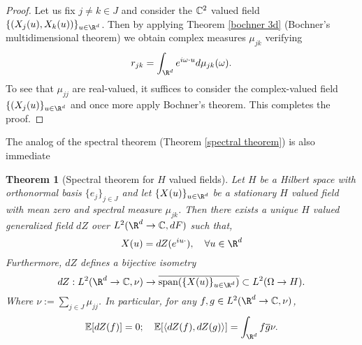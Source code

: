 \documentclass[12pt]{article}
\newtheorem{theorem}{Theorem}
\newcommand{\br}[1]{\left\langle#1\right\rangle}
\begin{document}
\begin{proof}
    Let us fix $j\neq k\in J$ and consider the $\mathbb{C}^2$ valued field $\{(X_j(u),X_k(u))\}_{u\in\R^d}$. Then by applying Theorem \ref{bochner 3d} (Bochner's multidimensional theorem) we obtain complex measures $\mu_{jk}$ verifying
    \begin{equation*}
        r_{jk}=\int_{\R^d} e^{i\omega \cdot u} d\mu _{j k}(\omega).
    \end{equation*}
    To  see that $\mu_{jj}$ are real-valued, it suffices to consider the complex-valued field $\{(X_j(u)\}_{u\in\R^d}$ and once more apply Bochner's theorem. This completes the proof.
\end{proof}
The analog of the spectral theorem (Theorem \ref{spectral theorem}) is also immediate
\begin{theorem}[Spectral theorem for $H$ valued fields]\label{spectral theorem hilbert}
    Let $H$ be a Hilbert space with orthonormal basis $\{e_j\}_{j\in J}$ and let $\{X(u)\}_{u\in\R^d}$ be a stationary $H$ valued field with mean zero and spectral measure $\mu_{jk}$. Then there exists a unique $H$ valued generalized field $dZ$ over $L^2(\R^d\to \C,dF)$ such that,
    \begin{equation}\label{spectral representation2}
        X(u)=dZ(e^{iu\cdot}),\quad\forall u\in\R^d
    \end{equation}
    Furthermore, $dZ$ defines a bijective isometry
    \begin{equation*}
        dZ:L^2(\R^d\to \C,\nu)\to\overline{\text{span}(\{X(u)\}_{u\in\R^d})}\subset L^2(\Omega\to H).
    \end{equation*}
    Where $\nu:=\sum_{j\in J} \mu_{jj}$.
    In particular, for any $f,g\in L^2(\R^d\to\C,\nu)$,
    \begin{equation}\label{dZ properties2}
        \E[dZ(f)]=0;\quad\E[\br{dZ(f),{dZ(g)}}]=\int_{\R^d} f\overline{g}\nu.
    \end{equation}
\end{theorem}
\end{document}
